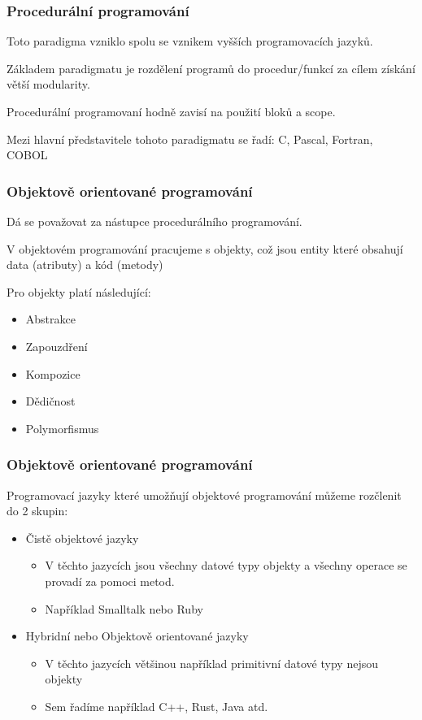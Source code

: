 \begin{frame}
    \frametitle{Procedurální programování}
    Toto paradigma vzniklo spolu se vznikem vyšších programovacích jazyků.
    
    Základem paradigmatu je rozdělení programů do procedur/funkcí za cílem získání větší modularity.

    Procedurální programovaní hodně zavisí na použití bloků a scope. %

    Mezi hlavní představitele tohoto paradigmatu se řadí: \break C, Pascal, Fortran, COBOL 


\end{frame}

\begin{frame}
    \frametitle{Objektově orientované programování}
    Dá se považovat za nástupce procedurálního programování. 
    
    V objektovém programování pracujeme s objekty, což jsou entity které obsahují data (atributy) a kód (metody)

    Pro objekty platí následující: %

    \begin{itemize}
        \item Abstrakce
        \item Zapouzdření
        \item Kompozice
        \item Dědičnost
        \item Polymorfismus
    \end{itemize}
    
\end{frame}


\begin{frame}
    \frametitle{Objektově orientované programování} %
    Programovací jazyky které umožňují objektové programování můžeme rozčlenit do 2 skupin:

    \begin{itemize}
        \item Čistě objektové jazyky\begin{itemize}
            \item V těchto jazycích jsou všechny datové typy objekty a všechny operace se provadí za pomoci metod.
            \item Například Smalltalk nebo Ruby
        \end{itemize}
        \item  Hybridní nebo Objektově orientované jazyky\begin{itemize}
            \item V těchto jazycích většinou například primitivní datové typy nejsou objekty
            \item Sem řadíme například C++, Rust, Java atd. 
        \end{itemize}
    \end{itemize}
\end{frame}




